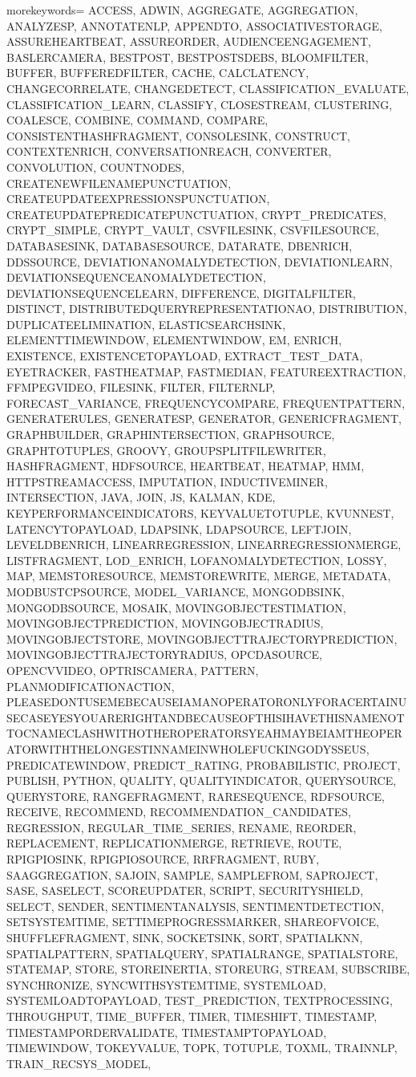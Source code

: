 
%
   {morekeywords={%
ACCESS, ADWIN, AGGREGATE, AGGREGATION, ANALYZESP, ANNOTATENLP, APPENDTO, ASSOCIATIVESTORAGE, ASSUREHEARTBEAT, ASSUREORDER, AUDIENCEENGAGEMENT, BASLERCAMERA, BESTPOST, BESTPOSTSDEBS, BLOOMFILTER, BUFFER, BUFFEREDFILTER, CACHE, CALCLATENCY, CHANGECORRELATE, CHANGEDETECT, CLASSIFICATION_EVALUATE, CLASSIFICATION_LEARN, CLASSIFY, CLOSESTREAM, CLUSTERING, COALESCE, COMBINE, COMMAND, COMPARE, CONSISTENTHASHFRAGMENT, CONSOLESINK, CONSTRUCT, CONTEXTENRICH, CONVERSATIONREACH, CONVERTER, CONVOLUTION, COUNTNODES, CREATENEWFILENAMEPUNCTUATION, CREATEUPDATEEXPRESSIONSPUNCTUATION, CREATEUPDATEPREDICATEPUNCTUATION, CRYPT_PREDICATES, CRYPT_SIMPLE, CRYPT_VAULT, CSVFILESINK, CSVFILESOURCE, DATABASESINK, DATABASESOURCE, DATARATE, DBENRICH, DDSSOURCE, DEVIATIONANOMALYDETECTION, DEVIATIONLEARN, DEVIATIONSEQUENCEANOMALYDETECTION, DEVIATIONSEQUENCELEARN, DIFFERENCE, DIGITALFILTER, DISTINCT, DISTRIBUTEDQUERYREPRESENTATIONAO, DISTRIBUTION, DUPLICATEELIMINATION, ELASTICSEARCHSINK, ELEMENTTIMEWINDOW, ELEMENTWINDOW, EM, ENRICH, EXISTENCE, EXISTENCETOPAYLOAD, EXTRACT_TEST_DATA, EYETRACKER, FASTHEATMAP, FASTMEDIAN, FEATUREEXTRACTION, FFMPEGVIDEO, FILESINK, FILTER, FILTERNLP, FORECAST_VARIANCE, FREQUENCYCOMPARE, FREQUENTPATTERN, GENERATERULES, GENERATESP, GENERATOR, GENERICFRAGMENT, GRAPHBUILDER, GRAPHINTERSECTION, GRAPHSOURCE, GRAPHTOTUPLES, GROOVY, GROUPSPLITFILEWRITER, HASHFRAGMENT, HDFSOURCE, HEARTBEAT, HEATMAP, HMM, HTTPSTREAMACCESS, IMPUTATION, INDUCTIVEMINER, INTERSECTION, JAVA, JOIN, JS, KALMAN, KDE, KEYPERFORMANCEINDICATORS, KEYVALUETOTUPLE, KVUNNEST, LATENCYTOPAYLOAD, LDAPSINK, LDAPSOURCE, LEFTJOIN, LEVELDBENRICH, LINEARREGRESSION, LINEARREGRESSIONMERGE, LISTFRAGMENT, LOD_ENRICH, LOFANOMALYDETECTION, LOSSY, MAP, MEMSTORESOURCE, MEMSTOREWRITE, MERGE, METADATA, MODBUSTCPSOURCE, MODEL_VARIANCE, MONGODBSINK, MONGODBSOURCE, MOSAIK, MOVINGOBJECTESTIMATION, MOVINGOBJECTPREDICTION, MOVINGOBJECTRADIUS, MOVINGOBJECTSTORE, MOVINGOBJECTTRAJECTORYPREDICTION, MOVINGOBJECTTRAJECTORYRADIUS, OPCDASOURCE, OPENCVVIDEO, OPTRISCAMERA, PATTERN, PLANMODIFICATIONACTION, PLEASEDONTUSEMEBECAUSEIAMANOPERATORONLYFORACERTAINUSECASEYESYOUARERIGHTANDBECAUSEOFTHISIHAVETHISNAMENOTTOCNAMECLASHWITHOTHEROPERATORSYEAHMAYBEIAMTHEOPERATORWITHTHELONGESTINNAMEINWHOLEFUCKINGODYSSEUS, PREDICATEWINDOW, PREDICT_RATING, PROBABILISTIC, PROJECT, PUBLISH, PYTHON, QUALITY, QUALITYINDICATOR, QUERYSOURCE, QUERYSTORE, RANGEFRAGMENT, RARESEQUENCE, RDFSOURCE, RECEIVE, RECOMMEND, RECOMMENDATION_CANDIDATES, REGRESSION, REGULAR_TIME_SERIES, RENAME, REORDER, REPLACEMENT, REPLICATIONMERGE, RETRIEVE, ROUTE, RPIGPIOSINK, RPIGPIOSOURCE, RRFRAGMENT, RUBY, SAAGGREGATION, SAJOIN, SAMPLE, SAMPLEFROM, SAPROJECT, SASE, SASELECT, SCOREUPDATER, SCRIPT, SECURITYSHIELD, SELECT, SENDER, SENTIMENTANALYSIS, SENTIMENTDETECTION, SETSYSTEMTIME, SETTIMEPROGRESSMARKER, SHAREOFVOICE, SHUFFLEFRAGMENT, SINK, SOCKETSINK, SORT, SPATIALKNN, SPATIALPATTERN, SPATIALQUERY, SPATIALRANGE, SPATIALSTORE, STATEMAP, STORE, STOREINERTIA, STOREURG, STREAM, SUBSCRIBE, SYNCHRONIZE, SYNCWITHSYSTEMTIME, SYSTEMLOAD, SYSTEMLOADTOPAYLOAD, TEST_PREDICTION, TEXTPROCESSING, THROUGHPUT, TIME_BUFFER, TIMER, TIMESHIFT, TIMESTAMP, TIMESTAMPORDERVALIDATE, TIMESTAMPTOPAYLOAD, TIMEWINDOW, TOKEYVALUE, TOPK, TOTUPLE, TOXML, TRAINNLP, TRAIN_RECSYS_MODEL, }}
